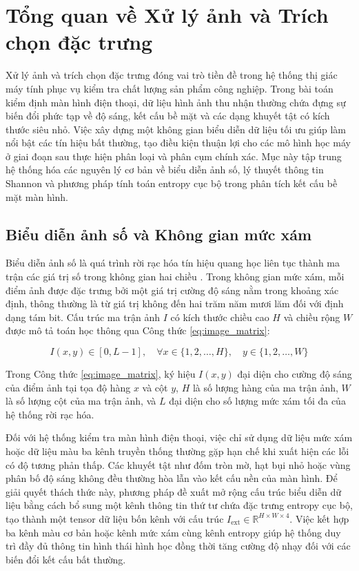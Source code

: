 \section{Tổng quan về Xử lý ảnh và Trích chọn đặc trưng}

Xử lý ảnh và trích chọn đặc trưng đóng vai trò tiền đề trong hệ thống thị giác máy tính phục vụ kiểm tra chất lượng sản phẩm công nghiệp. Trong bài toán kiểm định màn hình điện thoại, dữ liệu hình ảnh thu nhận thường chứa đựng sự biến đổi phức tạp về độ sáng, kết cấu bề mặt và các dạng khuyết tật có kích thước siêu nhỏ. Việc xây dựng một không gian biểu diễn dữ liệu tối ưu giúp làm nổi bật các tín hiệu bất thường, tạo điều kiện thuận lợi cho các mô hình học máy ở giai đoạn sau thực hiện phân loại và phân cụm chính xác. Mục này tập trung hệ thống hóa các nguyên lý cơ bản về biểu diễn ảnh số, lý thuyết thông tin Shannon và phương pháp tính toán entropy cục bộ trong phân tích kết cấu bề mặt màn hình.

\subsection{Biểu diễn ảnh số và Không gian mức xám}

Biểu diễn ảnh số là quá trình rời rạc hóa tín hiệu quang học liên tục thành ma trận các giá trị số trong không gian hai chiều \cite{gonzalez2018digital}. Trong không gian mức xám, mỗi điểm ảnh được đặc trưng bởi một giá trị cường độ sáng nằm trong khoảng xác định, thông thường là từ giá trị không đến hai trăm năm mươi lăm đối với định dạng tám bit. Cấu trúc ma trận ảnh $I$ có kích thước chiều cao $H$ và chiều rộng $W$ được mô tả toán học thông qua Công thức \ref{eq:image_matrix}:

\begin{equation}
I(x,y) \in [0, L-1], \quad \forall x \in \{1, 2, \dots, H\}, \quad y \in \{1, 2, \dots, W\}
\label{eq:image_matrix}
\end{equation}

Trong Công thức \ref{eq:image_matrix}, ký hiệu $I(x,y)$ đại diện cho cường độ sáng của điểm ảnh tại tọa độ hàng $x$ và cột $y$, $H$ là số lượng hàng của ma trận ảnh, $W$ là số lượng cột của ma trận ảnh, và $L$ đại diện cho số lượng mức xám tối đa của hệ thống rời rạc hóa.

Đối với hệ thống kiểm tra màn hình điện thoại, việc chỉ sử dụng dữ liệu mức xám hoặc dữ liệu màu ba kênh truyền thống thường gặp hạn chế khi xuất hiện các lỗi có độ tương phản thấp. Các khuyết tật như đốm tròn mờ, hạt bụi nhỏ hoặc vùng phân bố độ sáng không đều thường hòa lẫn vào kết cấu nền của màn hình. Để giải quyết thách thức này, phương pháp đề xuất mở rộng cấu trúc biểu diễn dữ liệu bằng cách bổ sung một kênh thông tin thứ tư chứa đặc trưng entropy cục bộ, tạo thành một tensor dữ liệu bốn kênh với cấu trúc $I_{\text{ext}} \in \mathbb{R}^{H \times W \times 4}$. Việc kết hợp ba kênh màu cơ bản hoặc kênh mức xám cùng kênh entropy giúp hệ thống duy trì đầy đủ thông tin hình thái hình học đồng thời tăng cường độ nhạy đối với các biến đổi kết cấu bất thường.

